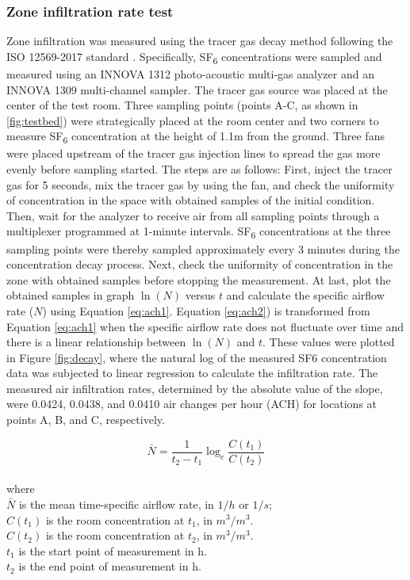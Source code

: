 \documentclass[3p,times,12pt]{elsarticle}
\begin{document}
\begin{sloppypar}
\subsubsection{Zone infiltration rate test}
\label{S:2.2.2}
Zone infiltration was measured using the tracer gas decay method following the ISO 12569-2017 standard \cite{iso12569}. Specifically, SF\textsubscript{6} concentrations were sampled and measured using an INNOVA 1312 photo-acoustic multi-gas analyzer and an INNOVA 1309 multi-channel sampler. The tracer gas source was placed at the center of the test room. Three sampling points (points A-C, as shown in \ref{fig:testbed}) were strategically placed at the room center and two corners to measure SF\textsubscript{6} concentration at the height of 1.1m from the ground. Three fans were placed upstream of the tracer gas injection lines to spread the gas more evenly before sampling started. The steps are as follows: First, inject the tracer gas for 5 seconds, mix the tracer gas by using the fan, and check the uniformity of concentration in the space with obtained samples of the initial condition. Then, wait for the analyzer to receive air from all sampling points through a multiplexer programmed at 1-minute intervals. SF\textsubscript{6} concentrations at the three sampling points were thereby sampled approximately every 3 minutes during the concentration decay process. Next, check the uniformity of concentration in the zone with obtained samples before stopping the measurement. At last, plot the obtained samples in graph $\ln\left(N\right)$ versus $t$ and calculate the specific airflow rate ($N$) using Equation \ref{eq:ach1}. Equation \ref{eq:ach2}) is transformed from Equation \ref{eq:ach1} when the specific airflow rate does not fluctuate over time and there is a linear relationship between $\ln\left(N\right)$ and $t$. These values were plotted in Figure \ref{fig:decay}, where the natural log of the measured SF6 concentration data was subjected to linear regression to calculate the infiltration rate. The measured air infiltration rates, determined by the absolute value of the slope, were 0.0424, 0.0438, and 0.0410 air changes per hour (ACH) for locations at points A, B, and C, respectively. 

\begin{equation}
\label{eq:ach1}
\bar N = \frac{1}{{t}_{2}-{t}_{1}} \log_{e}{\frac{C\left({t}_{1}\right)}{C\left({t}_{2}\right)}}
\end{equation} \\
where \\
$\bar N$ is the mean time-specific airflow rate, in $1/h$ or $1/s$; \\
$C\left({t}_{1}\right)$ \quad is the room concentration at ${t}_{1}$, in $m^3/m^3$. \\
$C\left({t}_{2}\right)$ \quad is the room concentration at ${t}_{2}$, in $m^3/m^3$. \\
${t}_{1}$ \qquad is the start point of measurement in h. \\
${t}_{2}$ \qquad is the end point of measurement in h. \\


\end{sloppypar}
\end{document}
